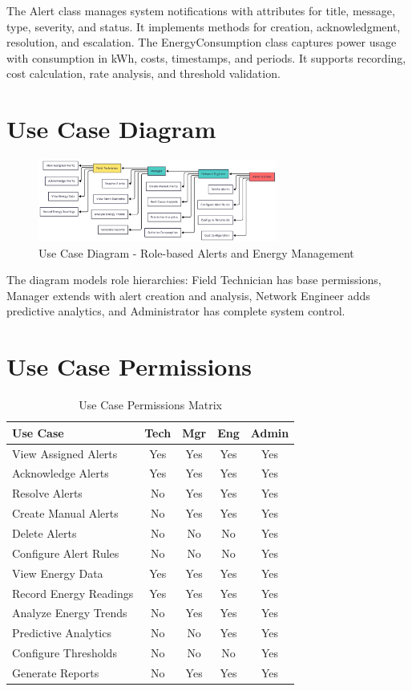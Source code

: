 The Alert class manages system notifications with attributes for title, message, type, severity, and status. It implements methods for creation, acknowledgment, resolution, and escalation. The EnergyConsumption class captures power usage with consumption in kWh, costs, timestamps, and periods. It supports recording, cost calculation, rate analysis, and threshold validation.

\section{Use Case Diagram}

\begin{figure}[H]
\centering
\includegraphics[width=0.7\textwidth]{img/chap_06/usecase_diagram_sprint4.png}
\caption{Use Case Diagram - Role-based Alerts and Energy Management}
\end{figure}

The diagram models role hierarchies: Field Technician has base permissions, Manager extends with alert creation and analysis, Network Engineer adds predictive analytics, and Administrator has complete system control.

\section{Use Case Permissions}

\begin{table}[htbp]
\centering
\caption{Use Case Permissions Matrix}
\small
\begin{tabular}{|p{4.5cm}|c|c|c|c|}
\hline
\textbf{Use Case} & \textbf{Tech} & \textbf{Mgr} & \textbf{Eng} & \textbf{Admin} \\
\hline
View Assigned Alerts & Yes & Yes & Yes & Yes \\
\hline
Acknowledge Alerts & Yes & Yes & Yes & Yes \\
\hline
Resolve Alerts & No & Yes & Yes & Yes \\
\hline
Create Manual Alerts & No & Yes & Yes & Yes \\
\hline
Delete Alerts & No & No & No & Yes \\
\hline
Configure Alert Rules & No & No & No & Yes \\
\hline
View Energy Data & Yes & Yes & Yes & Yes \\
\hline
Record Energy Readings & Yes & Yes & Yes & Yes \\
\hline
Analyze Energy Trends & No & Yes & Yes & Yes \\
\hline
Predictive Analytics & No & No & Yes & Yes \\
\hline
Configure Thresholds & No & No & No & Yes \\
\hline
Generate Reports & No & Yes & Yes & Yes \\
\hline
\end{tabular}
\end{table}

